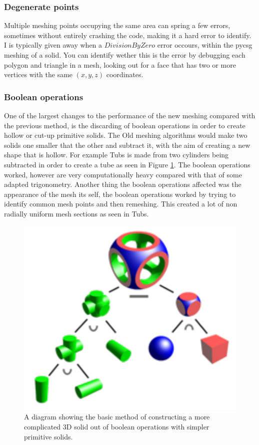 \documentclass[12pt,a4paper]{article}
\begin{document}
\subsubsection{Degenerate points}
Multiple meshing points occupying the same area can spring a few errors, sometimes without entirely crashing the code, making it a hard error to identify. I is typically given away when a $DivisionByZero$ error occours, within the pycsg meshing of a solid. You can identify wether this is the error by debugging each polygon and triangle in a mesh, looking out for a face that has two or more vertices with the same $(x,y,z)$ coordinates.

\subsubsection{Boolean operations}
\label{bool}
One of the largest changes to the performance of the new meshing compared with the previous method, is the discarding of boolean operations in order to create hollow or cut-up primitive solids. The Old meshing algorithms would make two solids one smaller that the other and subtract it, with the aim of creating a new shape that is hollow. For example Tubs is made from two cylinders being subtracted in order to create a tube as seen in Figure \ref{tubspic}. The boolean operations worked, however are very computationally heavy compared with that of some adapted trigonometry. Another thing the boolean operations affected was the appearance of the mesh its self, the boolean operations worked by trying to identify common mesh points and then remeshing. This created a lot of non radially uniform mesh sections as seen in Tubs.\\

\begin{figure}[h!]
\centering
\includegraphics[scale=1]{Images//Booleans//Boolean.pdf}
\caption[width=\columnwidth]{A diagram showing the basic method of constructing a more complicated 3D solid out of boolean operations with simpler primitive solids.}
\label{tubspic}
\end{figure}
\end{document}
